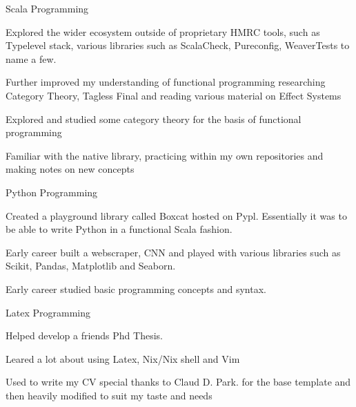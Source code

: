 \begin{cventries}
  \cventry
  {Scala Programming} %
  {} %
  {} %
  {} %
  {
    \begin{cvitems}
      \item {Explored the wider ecosystem outside of proprietary HMRC tools, such as Typelevel stack, various libraries such as ScalaCheck, Pureconfig, WeaverTests to name a few.}
      \item {Further improved my understanding of functional programming researching Category Theory, Tagless Final and reading various material on Effect Systems}
      \item {Explored and studied some category theory for the basis of functional programming}
      \item {Familiar with the native library, practicing within my own repositories and making notes on new concepts}
    \end{cvitems}
  }
  \cventry
  {Python Programming} %
  {} %
  {} %
  {} %
  {
    \begin{cvitems}
      \item {Created a playground library called Boxcat hosted on Pypl. Essentially it was to be able to write Python in a functional Scala fashion.}
      \item {Early career built a webscraper, CNN and played with various libraries such as Scikit, Pandas, Matplotlib and Seaborn.}
      \item {Early career studied basic programming concepts and syntax.}
    \end{cvitems}
  }
\cventry
{Latex Programming} %
{} %
{} %
{} %
{
  \begin{cvitems}
    \item {Helped develop a friends Phd Thesis.}
    \item {Leared a lot about using Latex, Nix/Nix shell and Vim}
    \item {Used to write my CV special thanks to Claud D. Park. for the base template and then heavily modified to suit my taste and needs}
  \end{cvitems}
}


\end{cventries}
